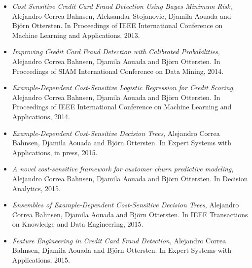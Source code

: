 \begin{itemize}
\item \citep{CorreaBahnsen2013} \textit{Cost Sensitive Credit Card Fraud Detection Using Bayes 
Minimum Risk}, Alejandro Correa Bahnsen,  Aleksandar Stojanovic, Djamila Aouada and Bj\"orn 
Ottersten. In Proceedings of IEEE International Conference on Machine Learning and Applications, 
2013.

\item \citep{CorreaBahnsen2014} \textit{Improving Credit Card Fraud Detection with Calibrated 
Probabilities}, Alejandro Correa Bahnsen, Djamila Aouada and Bj\"orn Ottersten.
In Proceedings of SIAM International Conference on Data Mining, 2014.

\item \citep{CorreaBahnsen2014b} \textit{Example-Dependent Cost-Sensitive Logistic Regression for 
Credit Scoring}, Alejandro Correa Bahnsen, Djamila Aouada and Bj\"orn Ottersten.
In Proceedings of IEEE International Conference on Machine Learning and Applications, 2014.

\item \citep{CorreaBahnsen2015} \textit{Example-Dependent Cost-Sensitive Decision Trees},
Alejandro Correa Bahnsen, Djamila Aouada and Bj\"orn Ottersten.
In Expert Systems with Applications, in press, 2015.

\item \citep{CorreaBahnsen2015a} \textit{A novel cost-sensitive framework for customer churn 
predictive modeling}, Alejandro Correa Bahnsen, Djamila Aouada and Bj\"orn Ottersten.
In Decision Analytics, 2015.

\item \citep{CorreaBahnsen2015b} \textit{Ensembles of Example-Dependent Cost-Sensitive Decision 
Trees}, Alejandro Correa Bahnsen, Djamila Aouada and Bj\"orn Ottersten.
In IEEE Transactions on Knowledge and Data Engineering, 2015.

\item \citep{CorreaBahnsen2015c} \textit{Feature Engineering in Credit Card Fraud Detection},
Alejandro Correa Bahnsen, Djamila Aouada and Bj\"orn Ottersten. In Expert Systems with 
Applications, 2015.

\end{itemize}
